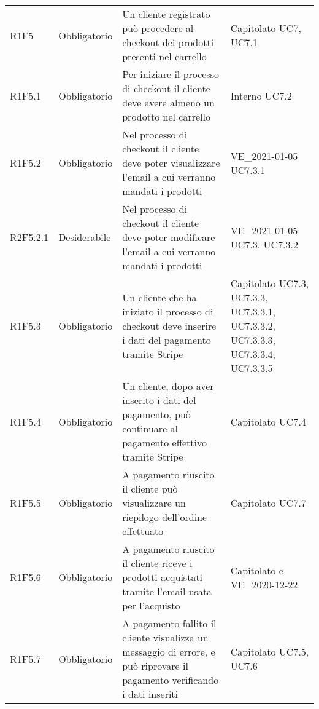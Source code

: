{\begin{longtable}{C{2.5cm} C{2.8cm} C{6.7cm} C{2.5cm}}
R1F5 & Obbligatorio & Un cliente registrato può procedere al checkout dei prodotti presenti nel carrello & Capitolato \newline UC7, UC7.1\\
R1F5.1 & Obbligatorio & Per iniziare il processo di checkout il cliente deve avere almeno un prodotto nel carrello & Interno \newline UC7.2\\
R1F5.2 & Obbligatorio & Nel processo di checkout il cliente deve poter visualizzare l'email a cui verranno mandati i prodotti & VE\_2021-01-05 \newline UC7.3.1 \\
R2F5.2.1 & Desiderabile & Nel processo di checkout il cliente deve poter modificare l'email a cui verranno mandati i prodotti & VE\_2021-01-05 \newline UC7.3, UC7.3.2 \\
R1F5.3 & Obbligatorio & Un cliente che ha iniziato il processo di checkout deve inserire i dati del pagamento tramite Stripe & Capitolato \newline UC7.3, UC7.3.3, UC7.3.3.1, UC7.3.3.2, UC7.3.3.3, UC7.3.3.4, UC7.3.3.5\\
R1F5.4 & Obbligatorio & Un cliente, dopo aver inserito i dati del pagamento, può continuare al pagamento effettivo tramite Stripe & Capitolato \newline UC7.4\\
R1F5.5 & Obbligatorio & A pagamento riuscito il cliente può visualizzare un riepilogo dell'ordine effettuato & Capitolato \newline UC7.7\\
R1F5.6 & Obbligatorio & A pagamento riuscito il cliente riceve i prodotti acquistati tramite l'email usata per l'acquisto & Capitolato e VE\_2020-12-22 \\
R1F5.7 & Obbligatorio & A pagamento fallito il cliente visualizza un messaggio di errore, e può riprovare il pagamento verificando i dati inseriti & Capitolato \newline UC7.5, UC7.6\\



\end{longtable}}
